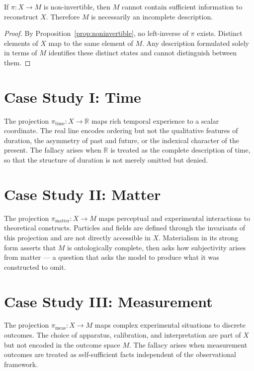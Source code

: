 \documentclass[11pt,openany]{book}
\begin{document}
\begin{proposition}
\label{prop:incomplete}
If $\pi : X \to M$ is non-invertible, then $M$ cannot
contain sufficient information to reconstruct $X$.
Therefore $M$ is necessarily an incomplete description.
\end{proposition}

\begin{proof}
By Proposition~\ref{prop:noninvertible}, no left-inverse of
$\pi$ exists. Distinct elements of $X$ map to the same
element of $M$. Any description formulated solely in terms
of $M$ identifies these distinct states and cannot
distinguish between them.
\end{proof}

\section{Case Study I: Time}
\label{sec:time}

The projection $\pi_{\mathrm{time}} : X \to \mathbb{R}$
maps rich temporal experience to a scalar coordinate. The
real line encodes ordering but not the qualitative features
of duration, the asymmetry of past and future, or the
indexical character of the present. The fallacy arises when
$\mathbb{R}$ is treated as the complete description of time,
so that the structure of duration is not merely omitted but
denied.

\section{Case Study II: Matter}
\label{sec:matter}

The projection $\pi_{\mathrm{matter}} : X \to M$ maps
perceptual and experimental interactions to theoretical
constructs. Particles and fields are defined through the
invariants of this projection and are not directly
accessible in $X$. Materialism in its strong form asserts
that $M$ is ontologically complete, then asks how
subjectivity arises from matter --- a question that asks
the model to produce what it was constructed to omit.

\section{Case Study III: Measurement}
\label{sec:measurement}

The projection $\pi_{\mathrm{meas}} : X \to M$ maps
complex experimental situations to discrete outcomes. The
choice of apparatus, calibration, and interpretation are
part of $X$ but not encoded in the outcome space $M$. The
fallacy arises when measurement outcomes are treated as
self-sufficient facts independent of the observational
framework.
\end{document}
